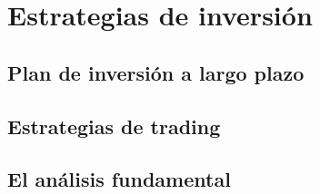 \chapter{Estrategias de inversión}

\section{Plan de inversión a largo plazo}




\section{Estrategias de trading}



\section{El análisis fundamental}
